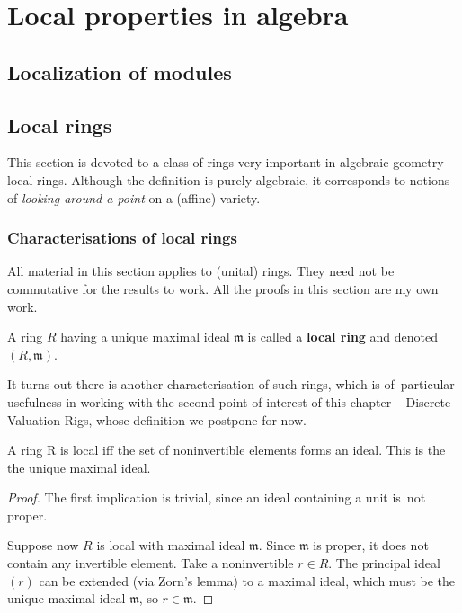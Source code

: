 \chapter{Local properties in algebra}

\section{Localization of modules}

\section{Local rings}

This section is devoted to a class of rings very important in algebraic geometry --
local rings. Although the definition is purely algebraic, it corresponds to
notions of \textit{looking around a point} on a (affine) variety.

\subsection{Characterisations of local rings}

All material in this section applies to (unital) rings. They need not be commutative
for the results to work. All the proofs in this section are my own work.

\begin{defn}
    A ring \( R \) having a unique maximal ideal \( \mathfrak{m} \) is called
    a {\bf local ring} and denoted \( (R, \mathfrak{m}) \).
\end{defn}

It turns out there is another characterisation of such rings, which is of~particular
usefulness in working with the second point of interest of this chapter -- Discrete
Valuation Rigs, whose definition we postpone for now.

\begin{thm}
    A ring R is local iff the set of noninvertible elements forms an ideal.
    This is the the unique maximal ideal.
\end{thm}

\begin{proof}
    The first implication is trivial, since an ideal containing a unit
    is~not proper.

    Suppose now \( R \) is local with maximal ideal \( \mathfrak{m} \).
    Since \( \mathfrak{m} \) is proper, it does not contain any invertible
    element. Take a noninvertible \( r \in R \). The principal ideal \( (r) \)
    can be extended (via Zorn's lemma) to a maximal ideal, which must be
    the unique maximal ideal \( \mathfrak{m} \), so \( r \in \mathfrak{m} \).

\end{proof}

